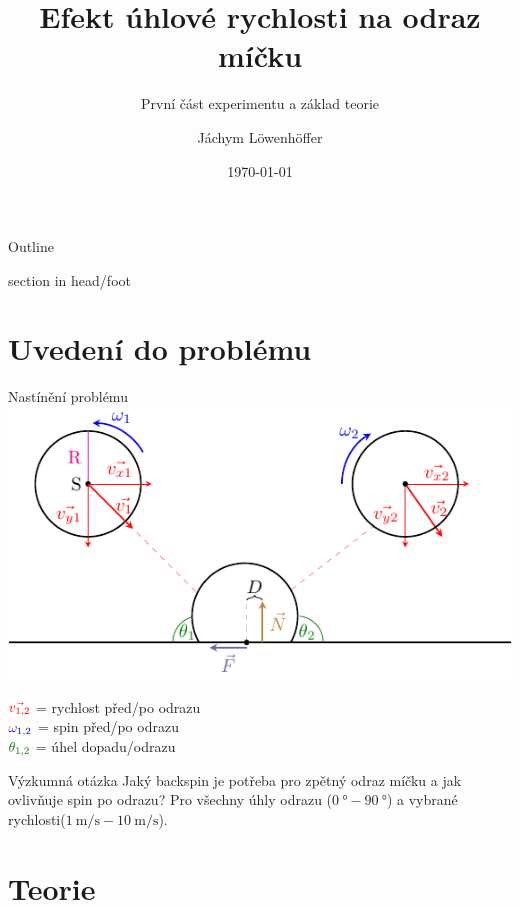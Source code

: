 \documentclass[secheader]{beamer}
\title{Efekt úhlové rychlosti na odraz míčku}
\subtitle{První část experimentu a základ teorie}
\author{Jáchym Löwenhöffer}
\institute{GEVO JM}
\date{\today}
\begin{document}
  \begin{frame}
  \titlepage
 \end{frame}

 \begin{frame}{Outline}
  \tableofcontents
 \end{frame}

{%
\begin{beamercolorbox}{section in head/foot}
\vskip1pt\insertnavigation{\paperwidth}\vskip2pt
\end{beamercolorbox}%
}

 \section{Uvedení do problému}
 
 \begin{frame}{Nastínění problému}
  \centering
  \includegraphics{diagram.pdf}\\
  \raggedright
  $\color{red}\vec{v_{1,2}}$ = rychlost před/po odrazu \\
  $\color{blue}\omega_{1,2}$ = spin před/po odrazu \\
  $\color[rgb]{0,0.5,0}\theta_{1,2}$ = úhel dopadu/odrazu \\
  
 \end{frame}

 \begin{frame}{Výzkumná otázka}
  \centering
  Jaký backspin je potřeba pro zpětný odraz míčku a jak ovlivňuje spin po
  odrazu? Pro všechny úhly odrazu
  ($\qty{0}{\degree}-\qty{90}{\degree}$) a vybrané
  rychlosti($\qty{1}{\meter\per\second} - \qty{10}{\meter\per\second}$).
 \end{frame}

 \section{Teorie} 
\end{document}
